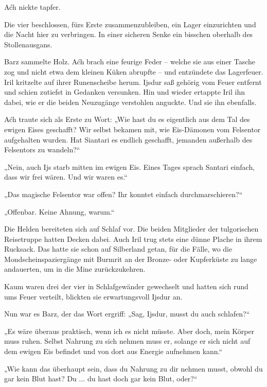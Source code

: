 Aćh nickte tapfer.\bigskip







Die vier beschlossen, fürs Erste zusammenzubleiben, ein Lager einzurichten und die Nacht hier zu verbringen. In einer sicheren Senke ein bisschen oberhalb des Stollenausgans.

Barz sammelte Holz. Aćh brach eine feurige Feder – welche sie aus einer Tasche zog und nicht etwa dem kleinen Küken abrupfte – und entzündete das Lagerfeuer. Iril kritzelte auf ihrer Runenscheibe herum. Ijsdur saß gehörig vom Feuer entfernt und schien zutiefst in Gedanken versunken. Hin und wieder ertappte Iril ihn dabei, wie er die beiden Neuzugänge verstohlen anguckte. Und sie ihn ebenfalls.

Aćh traute sich als Erste zu Wort: „Wie hast du es eigentlich aus dem Tal des ewigen Eises geschafft? Wir selbst bekamen mit, wie Eis-Dämonen vom Felsentor aufgehalten wurden. Hat Siantari es endlich geschafft, jemanden außerhalb des Felsentors zu wandeln?“

„Nein, auch Ijs starb mitten im ewigen Eis. Eines Tages sprach Santari einfach, dass wir frei wären. Und wir waren es.“

„Das magische Felsentor war offen? Ihr konntet einfach durchmarschieren?“

„Offenbar. Keine Ahnung, warum.“

Die Helden bereiteten sich auf Schlaf vor. Die beiden Mitglieder der tulgorischen Reisetruppe hatten Decken dabei. Auch Iril trug stets eine dünne Plache in ihrem Rucksack. Das hatte sie schon auf Silberland getan, für die Fälle, wo die Mondscheinspaziergänge mit Burmrit an der Bronze- oder Kupferküste zu lange andauerten, um in die Mine zurückzukehren.

Kaum waren drei der vier in Schlafgewänder gewechselt und hatten sich rund ums Feuer verteilt, blickten sie erwartungsvoll Ijsdur an.

Nun war es Barz, der das Wort ergriff: „Sag, Ijsdur, musst du auch schlafen?“

„Es wäre überaus praktisch, wenn ich es nicht müsste. Aber doch, mein Körper muss ruhen. Selbst Nahrung zu sich nehmen muss er, solange er sich nicht auf dem ewigen Eis befindet und von dort aus Energie aufnehmen kann.“

„Wie kann das überhaupt sein, dass du Nahrung zu dir nehmen musst, obwohl du gar kein Blut hast? Du ... du hast doch gar kein Blut, oder?“

